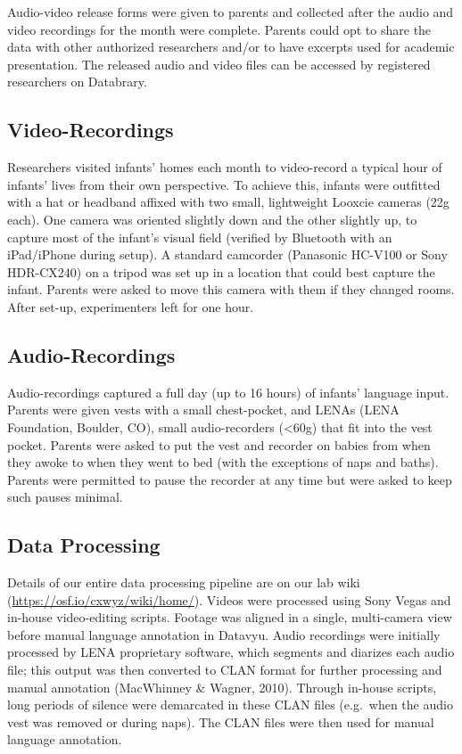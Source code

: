 \documentclass[floatsintext,man]{apa6}
\theoremstyle{definition}
\theoremstyle{definition}
\theoremstyle{definition}
\theoremstyle{remark}
\begin{document}
Audio-video release forms were given to parents and collected after the
audio and video recordings for the month were complete. Parents could
opt to share the data with other authorized researchers and/or to have
excerpts used for academic presentation. The released audio and video
files can be accessed by registered researchers on Databrary.

\subsection{Video-Recordings}\label{video-recordings}

Researchers visited infants' homes each month to video-record a typical
hour of infants' lives from their own perspective. To achieve this,
infants were outfitted with a hat or headband affixed with two small,
lightweight Looxcie cameras (22g each). One camera was oriented slightly
down and the other slightly up, to capture most of the infant's visual
field (verified by Bluetooth with an iPad/iPhone during setup). A
standard camcorder (Panasonic HC-V100 or Sony HDR-CX240) on a tripod was
set up in a location that could best capture the infant. Parents were
asked to move this camera with them if they changed rooms. After set-up,
experimenters left for one hour.

\subsection{Audio-Recordings}\label{audio-recordings}

Audio-recordings captured a full day (up to 16 hours) of infants'
language input. Parents were given vests with a small chest-pocket, and
LENAs (LENA Foundation, Boulder, CO), small audio-recorders
(\textless{}60g) that fit into the vest pocket. Parents were asked to
put the vest and recorder on babies from when they awoke to when they
went to bed (with the exceptions of naps and baths). Parents were
permitted to pause the recorder at any time but were asked to keep such
pauses minimal.

\subsection{Data Processing}\label{data-processing}

Details of our entire data processing pipeline are on our lab wiki
(\url{https://osf.io/cxwyz/wiki/home/}). Videos were processed using
Sony Vegas and in-house video-editing scripts. Footage was aligned in a
single, multi-camera view before manual language annotation in Datavyu.
Audio recordings were initially processed by LENA proprietary software,
which segments and diarizes each audio file; this output was then
converted to CLAN format for further processing and manual annotation
(MacWhinney \& Wagner, 2010). Through in-house scripts, long periods of
silence were demarcated in these CLAN files (e.g.~when the audio vest
was removed or during naps). The CLAN files were then used for manual
language annotation.
\end{document}
